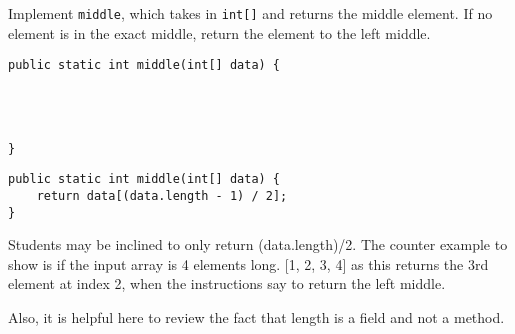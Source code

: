 \begin{blocksection}
\question Implement \lstinline$middle$, which takes in \lstinline$int[]$ and
returns the middle element. If no element is in the exact middle, return the
element to the left middle.

\ifprintanswers\else
\begin{lstlisting}
public static int middle(int[] data) {




}
\end{lstlisting}
\fi

\begin{solution}
\begin{lstlisting}
public static int middle(int[] data) {
    return data[(data.length - 1) / 2];
}
\end{lstlisting}

\begin{meta}
Students may be inclined to only return (data.length)/2. The counter example to show is if the input array is 4 elements long. [1, 2, 3, 4] as this returns the 3rd element at index 2, when the instructions say to return the left middle.

Also, it is helpful here to review the fact that length is a field and not a method. 
\end{meta}

\end{solution}
\end{blocksection}
